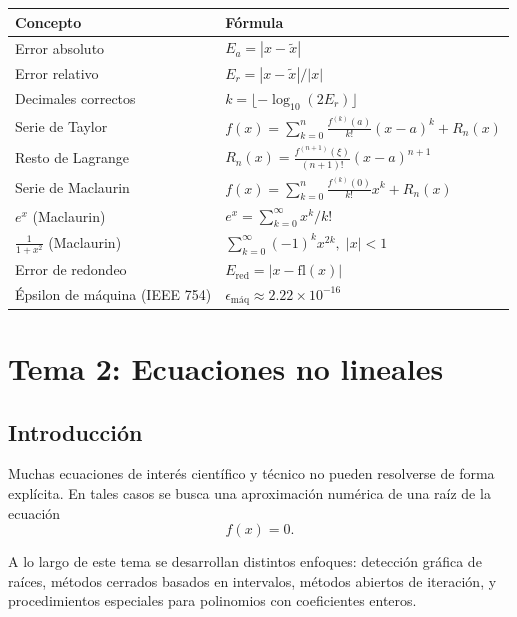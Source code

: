 \documentclass[a4paper,12pt]{article}
\newcommand{\fl}{\mathrm{fl}}
\theoremstyle{definition}
\theoremstyle{plain}
\begin{document}
\begin{center}
\begin{tabular}{ll}
\toprule
\textbf{Concepto} & \textbf{Fórmula} \\
\midrule
Error absoluto & $E_a = |x - \tilde{x}|$ \\[4pt]
Error relativo & $E_r = |x - \tilde{x}| / |x|$ \\[4pt]
Decimales correctos & $k = \lfloor -\log_{10}(2E_r) \rfloor$ \\[4pt]
Serie de Taylor & $f(x) = \sum_{k=0}^{n}
                  \frac{f^{(k)}(a)}{k!}(x-a)^k + R_n(x)$ \\[4pt]
Resto de Lagrange & $R_n(x) = \frac{f^{(n+1)}(\xi)}{(n+1)!}(x-a)^{n+1}$ \\[4pt]
Serie de Maclaurin & $f(x) = \sum_{k=0}^{n}
                     \frac{f^{(k)}(0)}{k!}x^k + R_n(x)$ \\[4pt]
$e^x$ (Maclaurin) & $e^x = \sum_{k=0}^{\infty} x^k / k!$ \\[4pt]
$\frac{1}{1+x^2}$ (Maclaurin) & $\sum_{k=0}^{\infty}(-1)^k x^{2k},\;|x|<1$ \\[4pt]
Error de redondeo & $E_{\mathrm{red}} = |x - \fl(x)|$ \\[4pt]
Épsilon de máquina (IEEE 754) & $\epsilon_{\mathrm{máq}} \approx 2.22\times
                                 10^{-16}$ \\
\bottomrule
\end{tabular}
\end{center}

\newpage

\section{Tema 2: Ecuaciones no lineales}

\subsection{Introducción}

Muchas ecuaciones de interés científico y técnico no pueden resolverse de forma
explícita. En tales casos se busca una aproximación numérica de una raíz de la
ecuación
\[
f(x)=0.
\]

A lo largo de este tema se desarrollan distintos enfoques: detección gráfica de
raíces, métodos cerrados basados en intervalos, métodos abiertos de iteración,
y procedimientos especiales para polinomios con coeficientes enteros.
\end{document}
